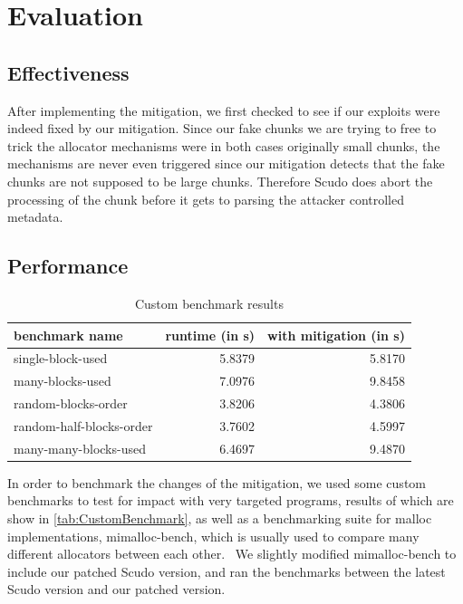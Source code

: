 \documentclass[a4paper,11pt,oneside]{report}
\begin{document}
\section{Evaluation}

\subsection{Effectiveness}

After implementing the mitigation, we first checked to see if our exploits were indeed
fixed by our mitigation. Since our fake chunks we are trying to free to trick the
allocator mechanisms were in both cases originally small chunks, the mechanisms are never
even triggered since our mitigation detects that the fake chunks are not supposed to be
large chunks. Therefore Scudo does abort the processing of the chunk before it gets to
parsing the attacker controlled metadata.

\subsection{Performance}

\begin{longtable}[h]{l r r}
  \caption{Custom benchmark results}\label{tab:CustomBenchmark} \\
  
  \toprule
  benchmark name           & runtime (in s) & with mitigation (in s) \\
  \midrule
  \endhead{}
  single-block-used        & 5.8379         & 5.8170                 \\
  \midrule
  many-blocks-used         & 7.0976         & 9.8458                 \\
  \midrule
  random-blocks-order      & 3.8206         & 4.3806                 \\
  \midrule
  random-half-blocks-order & 3.7602         & 4.5997                 \\
  \midrule
  many-many-blocks-used    & 6.4697         & 9.4870                 \\
  \bottomrule
\end{longtable}

In order to benchmark the changes of the mitigation, we used some custom benchmarks to
test for impact with very targeted programs, results of which are show in
\autoref{tab:CustomBenchmark}, as well as a benchmarking suite for malloc implementations,
mimalloc-bench, which is usually used to compare many different allocators between each
other.~\cite{mimalloc-bench} We slightly modified mimalloc-bench to include our patched
Scudo version, and ran the benchmarks between the latest Scudo version and our patched
version.
\end{document}
